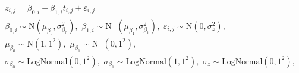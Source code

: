 \begin{equation}
\begin{gathered}
  z_{i, j} = \beta_{0, i} + \beta_{1, i}t_{i, j} + \varepsilon_{i, j} \\
  \beta_{0, i} \sim \text{N}(\mu_{\beta_{0}}, \sigma^{2}_{\beta_{0}}), \,\,
  \beta_{1, i} \sim \text{N}_{-}(\mu_{\beta_{1}}, \sigma^{2}_{\beta_{1}}), \,\,
  \varepsilon_{i, j} \sim \text{N}(0, \sigma^{2}_{z}), \\
  \mu_{\beta_{0}} \sim \text{N}(1, 1^2), \,\, 
  \mu_{\beta_{1}} \sim \text{N}_{-}(0, 1^2),  \\
  \sigma_{\beta_{0}} \sim \text{LogNormal}(0, 1^2), \,\, 
  \sigma_{\beta_{1}} \sim \text{LogNormal}(1, 1^2), \,\,  
  \sigma_{z} \sim \text{LogNormal}(0, 1^2),
\end{gathered}
\label{eqn:submodel-one-model}
\end{equation}